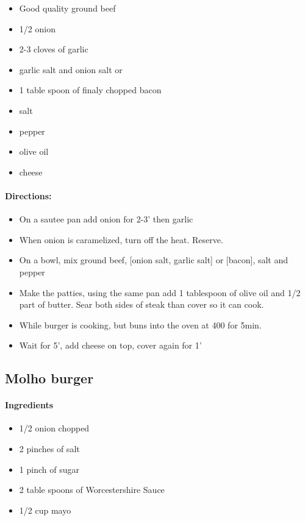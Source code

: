\documentclass{article}
\begin{document}
\begin{itemize}
	\item Good quality ground beef
	\item 1/2 onion
	\item 2-3 cloves of garlic
	\item garlic salt and onion salt or
	\item 1 table spoon of finaly chopped bacon
	\item salt
	\item pepper
	\item olive oil
	\item cheese
\end{itemize}

\paragraph{Directions:}
\begin{itemize}
	\item On a sautee pan add onion for 2-3' then garlic
	\item When onion is caramelized, turn off the heat. Reserve.
	\item On a bowl, mix ground beef, [onion salt, garlic salt] or [bacon], salt and pepper
	\item Make the patties, using the same pan add 1 tablespoon of olive oil and 1/2 part of butter. Sear both sides of steak than cover so it can cook.
	\item While burger is cooking, but buns into the oven at 400 for 5min.
	\item Wait for 5', add cheese on top, cover again for 1'
\end{itemize} 

\subsection{Molho burger}

\paragraph{Ingredients}
\begin{itemize}
	\item 1/2 onion chopped
	\item 2 pinches of salt
	\item 1 pinch of sugar
	\item 2 table spoons of Worcestershire Sauce
	\item 1/2 cup mayo
\end{itemize}
\end{document}
